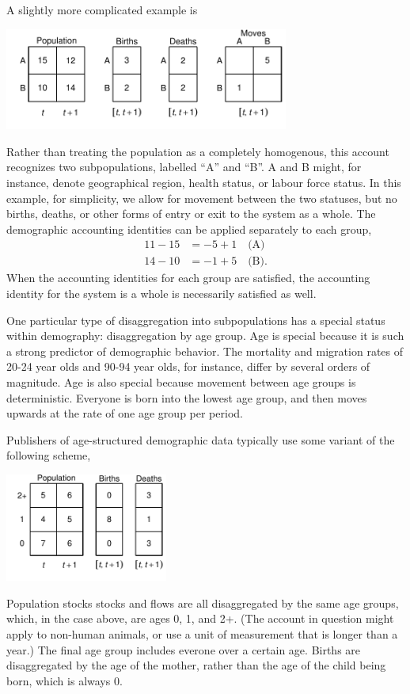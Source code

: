 \documentclass[USenglish]{article}
\begin{document}
A slightly more complicated example is
\begin{center}
\includegraphics[width=0.7\textwidth]{figures_accounts/fig_account_region.pdf}
\end{center}
Rather than treating the population as a completely homogenous, this account recognizes two subpopulations, labelled ``A'' and ``B''. A and B might, for instance, denote geographical region, health status, or labour force status. In this example, for simplicity, we allow for movement between the two statuses, but no births, deaths, or other forms of entry or exit to the system as a whole. The demographic accounting identities can be applied separately to each group,
\begin{align*}
    11 - 15 & = -5 + 1 \quad \text{(A)}\\
    14 - 10 & = -1 + 5 \quad \text{(B)}.
\end{align*}
When the accounting identities for each group are satisfied, the accounting identity for the system is a whole is necessarily satisfied as well.

One particular type of disaggregation into subpopulations has a special status within demography: disaggregation by age group. Age is special because it is such a strong predictor of demographic behavior. The mortality and migration rates of 20-24 year olds and 90-94 year olds, for instance, differ by several orders of magnitude. Age is also special because movement between age groups is deterministic. Everyone is born into the lowest age group, and then moves upwards at the rate of one age group per period.

Publishers of age-structured demographic data typically use some variant of the following scheme,
\begin{center}
\includegraphics[width=0.4\textwidth]{figures_accounts/fig_account_withage_nolex}
\end{center}
Population stocks stocks and flows are all disaggregated by the same age groups, which, in the case above, are ages 0, 1, and 2+. (The account in question might apply to non-human animals, or use a unit of measurement that is longer than a year.) The final age group includes everone over a certain age. Births are disaggregated by the age of the mother, rather than the age of the child being born, which is always 0. 
\end{document}
